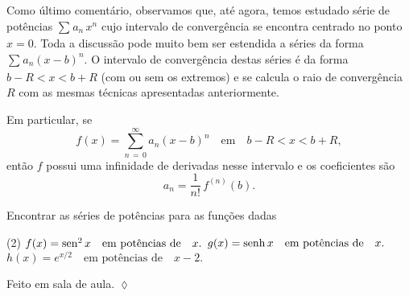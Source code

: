 Como último comentário, observamos que, até agora, temos estudado série de potências 
$\sum_{}a_n\,x^{n}$ cujo intervalo de convergência se encontra centrado no ponto $x = 0$. Toda 
a discussão pode muito bem ser estendida a séries da forma $\sum_{}a_{n}(x-b)^{n}$. O intervalo 
de convergência destas séries é da forma $b - R < x < b + R$ (com ou sem os extremos) e se calcula o 
raio de convergência $R$ com as mesmas técnicas apresentadas anteriormente.

Em particular, se
\begin{equation*}
  f(x) =\sum_{n\,=\, 0}^{\infty} a_n(x - b)^n\quad \text{em}\quad b - R < x < b +R,
\end{equation*}
então $f$ possui uma infinidade de derivadas nesse intervalo e os coeficientes são 
\begin{equation*}
  a_{n} = \dfrac{1}{n!}\,f^{(n)}(b).
\end{equation*}

\begin{exer}
Encontrar as séries de potências para as funções dadas
\begin{tasks}[label=(\alph*),item-indent=1.5cm,label-width=4ex,ref=(\alph*)](2)
\task \(f(x)=\operatorname{sen}^2 x\quad  \text{em potências de} \quad  x.\) 
\task \(g(x)=\operatorname{senh} x\quad  \text{em potências de}  \quad  x.\)
\task \(h(x)=e^{x/2}\quad \text{em potências de}  \quad x-2.\)
\end{tasks}
\end{exer}

\solo Feito em sala de aula. \hfill \(\lozenge\)

